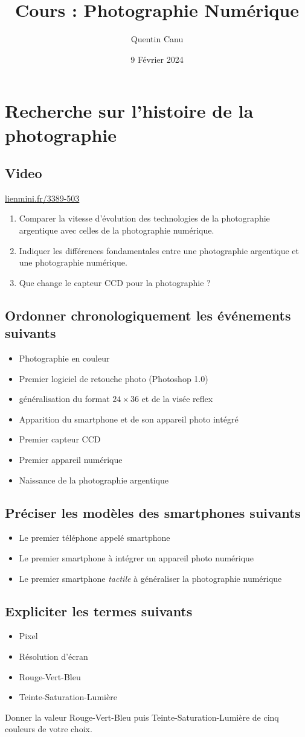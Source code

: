 \documentclass{article}
\title{Cours : Photographie Numérique}
\date{9 Février 2024}
\author{Quentin Canu}
\begin{document}
\maketitle

\section{Recherche sur l'histoire de la photographie}
\subsection{Video}
\url{lienmini.fr/3389-503}
\begin{enumerate}
\item Comparer la vitesse d'évolution des technologies de la photographie argentique avec celles de la photographie numérique.
\item Indiquer les différences fondamentales entre une photographie argentique et une photographie numérique.
\item Que change le capteur CCD pour la photographie ? 
\end{enumerate}
\subsection{Ordonner chronologiquement les événements suivants}
\begin{itemize}
\item Photographie en couleur
\item Premier logiciel de retouche photo (Photoshop 1.0)
\item généralisation du format $24 \times 36$ et de la visée reflex
\item Apparition du smartphone et de son appareil photo intégré
\item Premier capteur CCD
\item Premier appareil numérique
\item Naissance de la photographie argentique
\end{itemize}
\subsection{Préciser les modèles des smartphones suivants}
\begin{itemize}
\item Le premier téléphone appelé \og smartphone \fg
\item Le premier smartphone à intégrer un appareil photo numérique
\item Le premier smartphone \emph{tactile} à généraliser la photographie numérique  
\end{itemize}
\subsection{Expliciter les termes suivants}
\begin{itemize}
\item Pixel
\item Résolution d'écran
\item Rouge-Vert-Bleu
\item Teinte-Saturation-Lumière
\end{itemize}
Donner la valeur Rouge-Vert-Bleu puis Teinte-Saturation-Lumière de cinq couleurs de votre choix.
\end{document}
